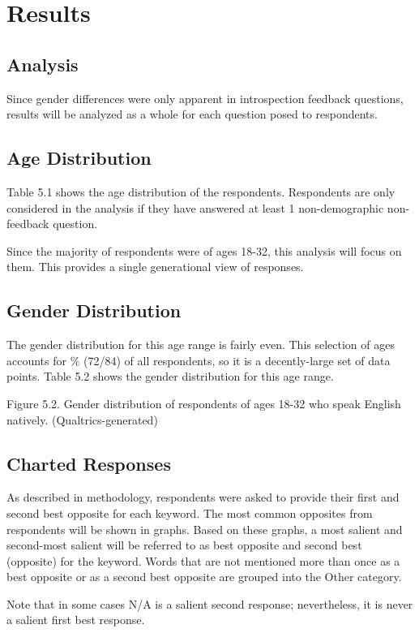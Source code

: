 \section {Results}
\subsection {Analysis} Since gender differences were only apparent in introspection feedback questions, results will be analyzed as a whole for each question posed to respondents.

\subsection {Age Distribution} Table 5.1 shows the age distribution of the respondents.  Respondents are only considered in the analysis if they have answered at least 1 non-demographic non-feedback question.

Since the majority of respondents were of ages 18-32, this analysis will focus on them.  This provides a single generational view of responses. 

\subsection {Gender Distribution} The gender distribution for this age range is fairly even.  This selection of ages accounts for \% (72/84) of all respondents, so it is a decently-large set of data points. Table 5.2 shows the gender distribution for this age range.


	Figure 5.2. Gender distribution of respondents of ages 18-32 who speak English natively. (Qualtrics-generated)

\subsection {Charted Responses} As described in methodology, respondents were asked to provide their first and second best opposite for each keyword.  The most common opposites from respondents will be shown in graphs.  Based on these graphs, a most salient and second-most salient will be referred to as best opposite and second best (opposite) for the keyword.  Words that are not mentioned more than once as a best opposite or as a second best opposite are grouped into the Other category.  
 
Note that in some cases N/A is a salient second response; nevertheless, it is never a salient first best response. 


